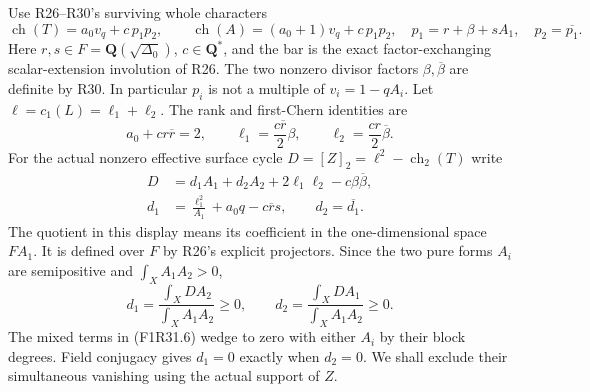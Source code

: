 Use R26--R30's surviving whole characters
\[
 \operatorname{ch}(T)=a_0v_q+c\,p_1p_2,\qquad
 \operatorname{ch}(A)=(a_0+1)v_q+c\,p_1p_2,
 \quad
 p_1=r+\beta+sA_1,\quad p_2=\overline{p_1}.
 \tag{F1R31.4}
\]
Here $r,s\in F=\mathbf Q(\sqrt{\Delta_0})$,
$c\in\mathbf Q^*$, and the bar is the exact
factor-exchanging scalar-extension involution
of R26. The two nonzero divisor factors
$\beta,\overline\beta$ are definite by R30.
In particular $p_i$ is not a multiple of
$v_i=1-qA_i$. Let $\ell=c_1(L)=\ell_1+\ell_2$.
The rank and first-Chern identities are
\[
       a_0+c r\overline r=2,\qquad
       \ell_1=\frac{c\overline r}{2}\beta,
       \qquad \ell_2=\frac{cr}{2}\overline\beta.
 \tag{F1R31.5}
\]
For the actual nonzero effective surface cycle
$D=[Z]_2=\ell^2-\operatorname{ch}_2(T)$ write
\[
 \begin{split}
 D&=d_1A_1+d_2A_2+2\ell_1\ell_2-c\beta\overline\beta,\\
 d_1&=\frac{\ell_1^2}{A_1}+a_0q-c\overline r s,
       \qquad d_2=\overline{d_1}.
 \end{split}
 \tag{F1R31.6}
\]
The quotient in this display means its
coefficient in the one-dimensional space
$F A_1$. It is defined over $F$ by R26's
explicit projectors. Since the two pure
forms $A_i$ are semipositive and
$\int_X A_1A_2>0$,
\[
 d_1=\frac{\int_X D A_2}{\int_X A_1A_2}\ge0,
 \qquad
 d_2=\frac{\int_X D A_1}{\int_X A_1A_2}\ge0.
 \tag{F1R31.7}
\]
The mixed terms in (F1R31.6) wedge to zero
with either $A_i$ by their block degrees.
Field conjugacy gives $d_1=0$ exactly when
$d_2=0$. We shall exclude their simultaneous
vanishing using the actual support of $Z$.

